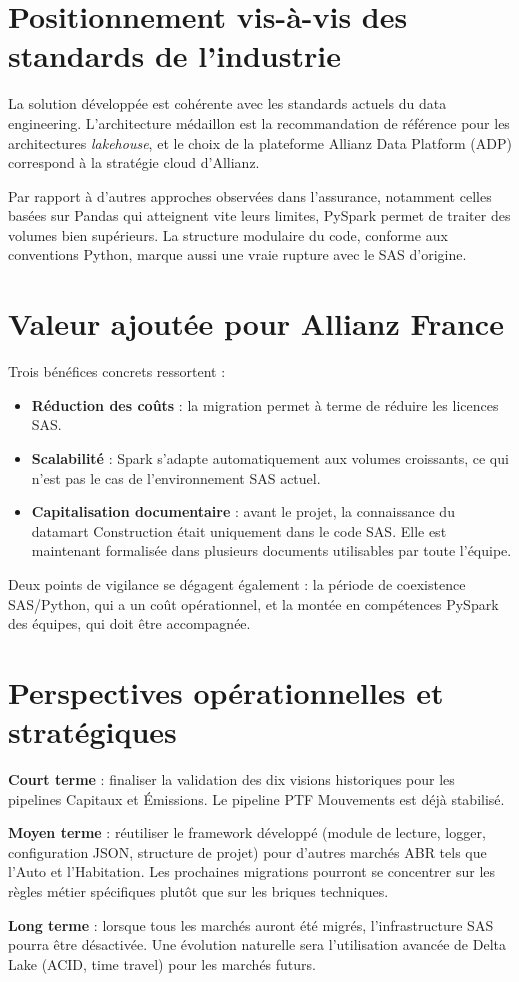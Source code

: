 \section{Positionnement vis-à-vis des standards de l'industrie}

La solution développée est cohérente avec les standards actuels du data engineering. L’architecture médaillon est la recommandation de référence pour les architectures \textit{lakehouse}, et le choix de la plateforme Allianz Data Platform (ADP) correspond à la stratégie cloud d’Allianz.

Par rapport à d’autres approches observées dans l’assurance, notamment celles basées sur Pandas qui atteignent vite leurs limites, PySpark permet de traiter des volumes bien supérieurs. La structure modulaire du code, conforme aux conventions Python, marque aussi une vraie rupture avec le SAS d’origine.

\section{Valeur ajoutée pour Allianz France}

Trois bénéfices concrets ressortent :

\begin{itemize}
    \item \textbf{Réduction des coûts} : la migration permet à terme de réduire les licences SAS.
    \item \textbf{Scalabilité} : Spark s’adapte automatiquement aux volumes croissants, ce qui n’est pas le cas de l’environnement SAS actuel.
    \item \textbf{Capitalisation documentaire} : avant le projet, la connaissance du datamart Construction était uniquement dans le code SAS. Elle est maintenant formalisée dans plusieurs documents utilisables par toute l’équipe.
\end{itemize}

Deux points de vigilance se dégagent également : la période de coexistence SAS/Python, qui a un coût opérationnel, et la montée en compétences PySpark des équipes, qui doit être accompagnée.

\section{Perspectives opérationnelles et stratégiques}

\textbf{Court terme} : finaliser la validation des dix visions historiques pour les pipelines Capitaux et Émissions. Le pipeline PTF Mouvements est déjà stabilisé.

\textbf{Moyen terme} : réutiliser le framework développé (module de lecture, logger, configuration JSON, structure de projet) pour d'autres marchés ABR tels que l'Auto et l'Habitation. Les prochaines migrations pourront se concentrer sur les règles métier spécifiques plutôt que sur les briques techniques.

\textbf{Long terme} : lorsque tous les marchés auront été migrés, l’infrastructure SAS pourra être désactivée. Une évolution naturelle sera l’utilisation avancée de Delta Lake (ACID, time travel) pour les marchés futurs.